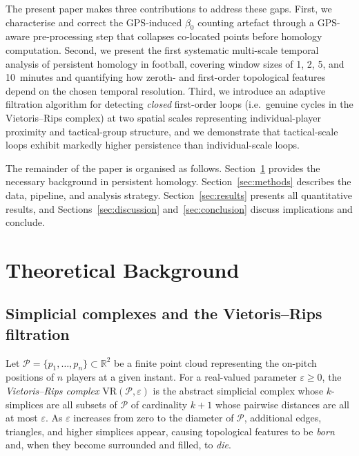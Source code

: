 \documentclass[11pt,a4paper]{article}
\begin{document}
The present paper makes three contributions to address
these gaps.  First, we characterise and correct the
GPS-induced \(\beta_0\) counting artefact through a
GPS-aware pre-processing step that collapses co-located
points before homology computation.  Second, we present the
first systematic multi-scale temporal analysis of persistent
homology in football, covering window sizes of 1, 2, 5, and
10~minutes and quantifying how zeroth- and first-order
topological features depend on the chosen temporal
resolution.  Third, we introduce an adaptive filtration
algorithm for detecting \emph{closed} first-order loops
(i.e.\ genuine cycles in the Vietoris--Rips complex) at
two spatial scales representing individual-player proximity
and tactical-group structure, and we demonstrate that
tactical-scale loops exhibit markedly higher persistence
than individual-scale loops.

The remainder of the paper is organised as follows.
Section~\ref{sec:background} provides the necessary
background in persistent homology.
Section~\ref{sec:methods} describes the data, pipeline, and
analysis strategy.  Section~\ref{sec:results} presents all
quantitative results, and Sections~\ref{sec:discussion}
and~\ref{sec:conclusion} discuss implications and conclude.

\section{Theoretical Background}
\label{sec:background}

\subsection{Simplicial complexes and the Vietoris--Rips
filtration}

Let \(\mathcal{P} = \{p_1, \dots, p_n\} \subset \mathbb{R}^2\)
be a finite point cloud representing the on-pitch positions
of \(n\) players at a given instant.  For a real-valued
parameter \(\varepsilon \geq 0\), the \emph{Vietoris--Rips
complex} \(\mathrm{VR}(\mathcal{P},\varepsilon)\) is the
abstract simplicial complex whose \(k\)-simplices are all
subsets of \(\mathcal{P}\) of cardinality \(k+1\) whose
pairwise distances are all at most \(\varepsilon\).  As
\(\varepsilon\) increases from zero to the diameter of
\(\mathcal{P}\), additional edges, triangles, and higher
simplices appear, causing topological features to be
\emph{born} and, when they become surrounded and filled,
to \emph{die}.
\end{document}
